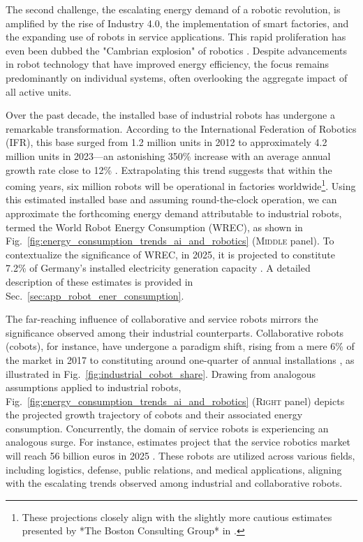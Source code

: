 \documentclass[12pt]{article}
\begin{document}
The second challenge, the escalating energy demand of a robotic revolution, is amplified by the rise of Industry 4.0, the implementation of smart factories, and the expanding use of robots in service applications. This rapid proliferation has even been dubbed the "Cambrian explosion" of robotics \cite{Pratt2015Iscambrianexplosion}. Despite advancements in robot technology that have improved energy efficiency, the focus remains predominantly on individual systems, often overlooking the aggregate impact of all active units.

Over the past decade, the installed base of industrial robots has undergone a remarkable transformation. According to the International Federation of Robotics (IFR), this base surged from 1.2 million units in 2012 to approximately 4.2 million units in 2023—an astonishing 350\% increase with an average annual growth rate close to 12\% \cite{IFR2024WorldRobotics2024}. Extrapolating this trend suggests that within the coming years, six million robots will be operational in factories worldwide\footnote{These projections closely align with the slightly more cautious estimates presented by *The Boston Consulting Group* in \cite{Sirkin2015HowRobotsWill}.}. Using this estimated installed base and assuming round-the-clock operation, we can approximate the forthcoming energy demand attributable to industrial robots, termed the World Robot Energy Consumption (WREC), as shown in Fig.~\ref{fig:energy_consumption_trends_ai_and_robotics} (\textsc{Middle} panel). To contextualize the significance of WREC, in 2025, it is projected to constitute 7.2\% of Germany's installed electricity generation capacity \cite{FraunhoferISENetinstalledelectricity}. A detailed description of these estimates is provided in Sec.~\ref{sec:app_robot_ener_consumption}.

The far-reaching influence of collaborative and service robots mirrors the significance observed among their industrial counterparts. Collaborative robots (cobots), for instance, have undergone a paradigm shift, rising from a mere 6\% of the market in 2017 to constituting around one-quarter of annual installations \cite{tobe2015}, as illustrated in Fig.~\ref{fig:industrial_cobot_share}. Drawing from analogous assumptions applied to industrial robots, Fig.~\ref{fig:energy_consumption_trends_ai_and_robotics} (\textsc{Right} panel) depicts the projected growth trajectory of cobots and their associated energy consumption. Concurrently, the domain of service robots is experiencing an analogous surge. For instance, estimates project that the service robotics market will reach 56 billion euros in 2025 \cite{statista_service_robots}. These robots are utilized across various fields, including logistics, defense, public relations, and medical applications, aligning with the escalating trends observed among industrial and collaborative robots.
\end{document}
